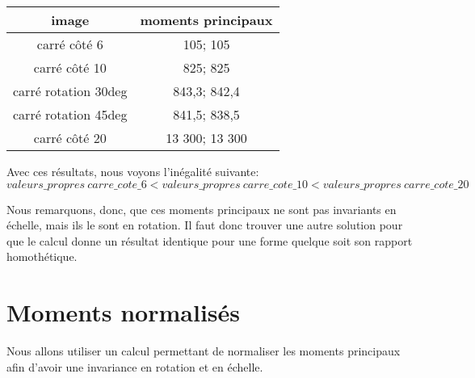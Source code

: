 \documentclass{article}
\begin{document}
  \begin{center}
    \begin{tabular}{|c|c|}
      \hline
      \textbf{image} & \textbf{moments principaux} \\
      \hline
      carré côté 6 & 105; 105 \\
      \hline
      carré côté 10 & 825; 825 \\
      \hline
      carré rotation 30deg & 843,3; 842,4 \\
      \hline
      carré rotation 45deg & 841,5; 838,5 \\
      \hline
      carré côté 20 & 13 300; 13 300 \\
      \hline
    \end{tabular}
  \end{center}
  
  Avec ces résultats, nous voyons l'inégalité suivante:
  $$
    valeurs\_propres\ carre\_cote\_6 < valeurs\_propres\ carre\_cote\_10 < valeurs\_propres\ carre\_cote\_20
  $$
  
  Nous remarquons, donc, que ces moments principaux ne sont pas invariants en échelle, mais 
  ils le sont en rotation.
  Il faut donc trouver une autre solution pour que le calcul donne un résultat identique
  pour une forme quelque soit son rapport homothétique.
  
  \newpage
  
  \section{Moments normalisés}
  Nous allons utiliser un calcul permettant de normaliser les moments principaux afin d'avoir
  une invariance en rotation et en échelle.\\
  
\end{document}
